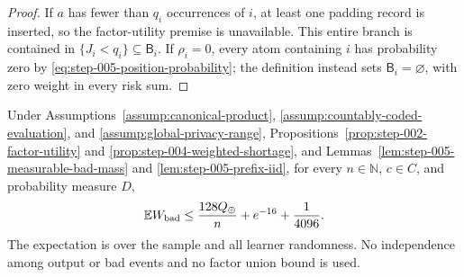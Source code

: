 \begin{proof}
If \(a\) has fewer than \(q_i\) occurrences of \(i\), at least one
padding record is inserted, so the factor-utility premise is unavailable.
This entire branch is contained in
\(\{J_i<q_i\}\subseteq\mathsf B_i\).  If \(\rho_i=0\), every atom
containing \(i\) has probability zero by
\eqref{eq:step-005-position-probability}; the definition instead sets
\(\mathsf B_i=\varnothing\), with zero weight in every risk sum.
\end{proof}

\begin{proposition}
\label{prop:step-005-weighted-bad-mass}
Under Assumptions~\ref{assump:canonical-product},
\ref{assump:countably-coded-evaluation}, and
\ref{assump:global-privacy-range},
Propositions~\ref{prop:step-002-factor-utility} and
\ref{prop:step-004-weighted-shortage}, and
Lemmas~\ref{lem:step-005-measurable-bad-mass} and
\ref{lem:step-005-prefix-iid}, for every \(n\in\mathbb N\), \(c\in C\),
and probability measure \(D\),
\begin{equation}\label{eq:step-005-bad-mass-expectation}
\mathbb E W_{\rm bad}
\le\frac{128Q_\oplus}{n}+e^{-16}+\frac1{4096}.
\end{equation}
The expectation is over the sample and all learner randomness.  No
independence among output or bad events and no factor union bound is used.
\end{proposition}

